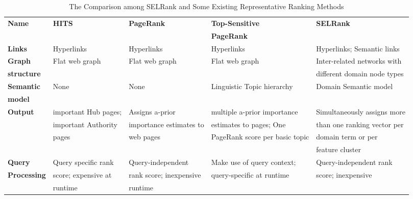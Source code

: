 \documentclass[sigconf]{acmart}
\begin{document}
\begin{table*}[]
    \begin{tabular}{|l|l|l|l|l|}
    \hline
\textbf{Name} & \textbf{HITS} & \textbf{PageRank} & \textbf{Top-Sensitive} & \textbf{SELRank} \\ 
 & & & \textbf{PageRank} & \\ \hline
\textbf{Links} & Hyperlinks & Hyperlinks & Hyperlinks & Hyperlinks; Semantic links \\ \hline 
 \textbf{Graph} & Flat web graph & Flat web graph & Flat web graph  & Inter-related networks with\\
 \textbf{structure} & & & & different domain node types \\\hline
 \textbf{Semantic} & None & None & Linguistic Topic hierarchy& Domain Semantic model\\ 
 \textbf{model} & & & & \\ \hline
 \textbf{Output} & important Hub pages; & Assigns a-prior & multiple a-prior importance & Simultaneously assigns more \\
 & important Authority & importance estimates to  & estimates to pages; One & than one ranking vector per \\
 & pages &web pages & PageRank score per basic topic & domain term or per  \\
 & & & & feature cluster \\\hline
 \textbf{Query} & Query specific rank & Query-independent & Make use of query context;& Query-independent rank \\
 \textbf{Processing} & score; expensive at & rank score; inexpensive & query-specific at runtime & score; inexpensive \\ 
 & runtime& runtime & &\\ \hline
    \end{tabular}
    \caption{The Comparison among SELRank and Some Existing Representative Ranking Methods}
    \label{tab:1}
\end{table*}
\end{document}

